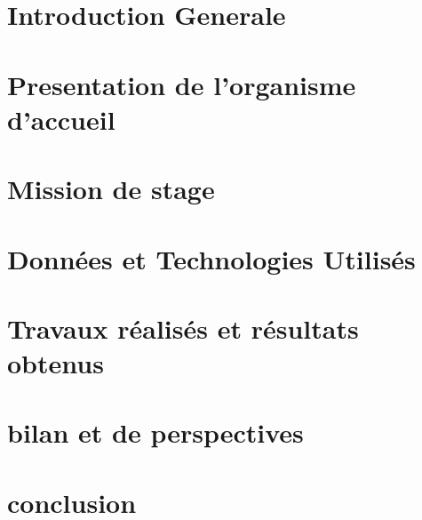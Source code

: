 \newpage
\section{Introduction Generale} 
 
\section{Presentation de l'organisme  d'accueil}

\newpage
\section{Mission de stage}

\section{Données et Technologies Utilisés} 

\section{Travaux réalisés et résultats obtenus} 
 
\section{bilan et de perspectives}

\section{conclusion}

